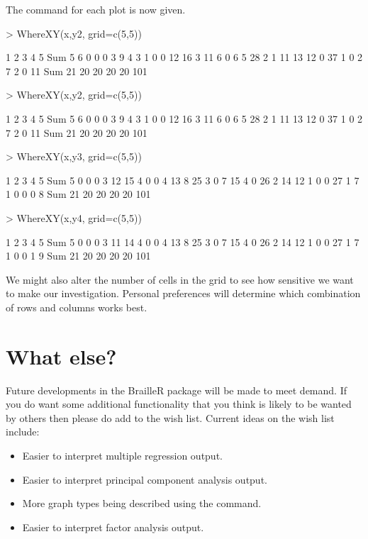 The  command for each plot is now given. 
\begin{Schunk}
\begin{Sinput}
> WhereXY(x,y2, grid=c(5,5)) 
\end{Sinput}
\begin{Soutput}
     1  2  3  4  5 Sum
5    6  0  0  0  3   9
4    3  1  0  0 12  16
3   11  6  0  6  5  28
2    1 11 13 12  0  37
1    0  2  7  2  0  11
Sum 21 20 20 20 20 101
\end{Soutput}
\begin{Sinput}
> WhereXY(x,y2, grid=c(5,5)) 
\end{Sinput}
\begin{Soutput}
     1  2  3  4  5 Sum
5    6  0  0  0  3   9
4    3  1  0  0 12  16
3   11  6  0  6  5  28
2    1 11 13 12  0  37
1    0  2  7  2  0  11
Sum 21 20 20 20 20 101
\end{Soutput}
\begin{Sinput}
> WhereXY(x,y3, grid=c(5,5)) 
\end{Sinput}
\begin{Soutput}
     1  2  3  4  5 Sum
5    0  0  0  3 12  15
4    0  0  4 13  8  25
3    0  7 15  4  0  26
2   14 12  1  0  0  27
1    7  1  0  0  0   8
Sum 21 20 20 20 20 101
\end{Soutput}
\begin{Sinput}
> WhereXY(x,y4, grid=c(5,5)) 
\end{Sinput}
\begin{Soutput}
     1  2  3  4  5 Sum
5    0  0  0  3 11  14
4    0  0  4 13  8  25
3    0  7 15  4  0  26
2   14 12  1  0  0  27
1    7  1  0  0  1   9
Sum 21 20 20 20 20 101
\end{Soutput}
\end{Schunk}
 
We might also alter the number of cells in the grid to see how sensitive we want to make our investigation. Personal preferences will determine which combination of rows and columns works best. 
 
\section{What else?} 
 
Future developments in the BrailleR package will be made to meet demand. If you do want some additional functionality that you think is likely to be wanted by others then please do add to the wish list. Current ideas on the wish list include: 
\begin{itemize} 
\item Easier to interpret multiple regression output. 
\item Easier to interpret principal component analysis output. 
\item More graph types being described using the  command. 
\item Easier to interpret factor analysis output. 
\end{itemize} 
 
 
 


